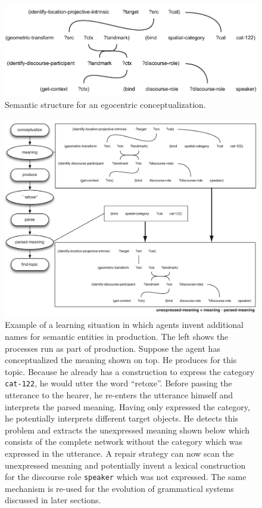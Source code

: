\begin{figure}[h]
\begin{center}
\includegraphics[width=1.0\columnwidth]{figs/semantic-structure-egocentric-speaker}
\end{center}
\caption{Semantic structure for an egocentric conceptualization.}
\label{f:egocentric-speaker}
\end{figure}
\begin{figure}
\begin{center}
\includegraphics[width=1.0\columnwidth]{figs/mark-unexpressed-meaning}
\end{center}
\caption[Grammatical marker invention]{Example of a learning situation in which agents invent additional names 
for semantic entities in production. The left shows the processes run as 
part of production. Suppose the agent has conceptualized the meaning shown 
on top. He produces for this topic. Because he already has a construction to
express the category {\footnotesize\tt cat-122}, he would utter the word ``retoxe''.
Before passing the utterance to the hearer, he re-enters the utterance himself
and interprets the parsed meaning. Having only expressed the category, 
he potentially interprets different target objects.
He detects this problem and extracts the unexpressed meaning shown below which
consists of the complete network without the category which was expressed in
the utterance. A repair strategy can now scan the unexpressed meaning and
potentially invent a lexical construction for the discourse role {\footnotesize\tt speaker}
which was not expressed. The same mechanism is re-used for the evolution of grammatical 
systems discussed in later sections.}
\label{f:marking-unexpressed-meaning}
\end{figure}


